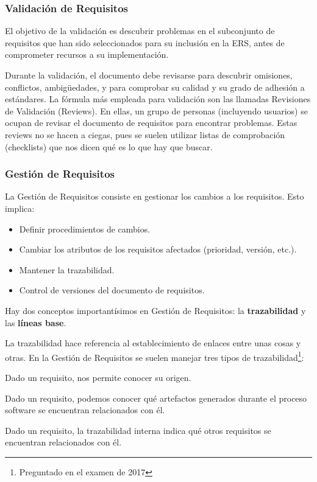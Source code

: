 \subsubsection{Validación de Requisitos}
\label{sec:requisitos:validacion}

El objetivo de la validación es descubrir problemas en el subconjunto
de requisitos que han sido seleccionados para su inclusión en la ERS,
antes de comprometer recursos a su implementación.

Durante la validación, el documento debe revisarse para descubrir
omisiones, conflictos, ambigüedades, y para comprobar su calidad y su
grado de adhesión a estándares. La fórmula más empleada para
validación son las llamadas Revisiones de Validación (Reviews). En
ellas, un grupo de personas (incluyendo usuarios) se ocupan de revisar
el documento de requisitos para encontrar problemas. Estas reviews no
se hacen a ciegas, pues se suelen utilizar listas de comprobación
(checklists) que nos dicen qué es lo que hay que buscar.

\subsubsection{Gestión de Requisitos}
\label{sec:requisitos:gestion}

La Gestión de Requisitos consiste en gestionar los cambios a los
requisitos. Esto implica:

\begin{itemize}[noitemsep]
\item Definir procedimientos de cambios.
\item Cambiar los atributos de los requisitos afectados (prioridad, versión, etc.).
\item Mantener la trazabilidad.
\item Control de versiones del documento de requisitos.
\end{itemize}

Hay dos conceptos importantísimos en Gestión de Requisitos: la \textbf{trazabilidad} y las \textbf{líneas base}.

La trazabilidad hace referencia al establecimiento de enlaces entre
unas cosas y otras. En la Gestión de Requisitos se suelen manejar tres
tipos de trazabilidad\footnote{Preguntado en el examen de 2017}:

\begin{description}[noitemsep]
\item [Trazabilidad hacia atrás] Dado un requisito, nos permite conocer
  su origen.
\item [Trazabilidad hacia delante] Dado un requisito, podemos conocer
  qué artefactos generados durante el proceso software se encuentran
  relacionados con él.
\item [Trazabilidad interna] Dado un requisito, la trazabilidad interna
  indica qué otros requisitos se encuentran relacionados con él.
\end{description}

